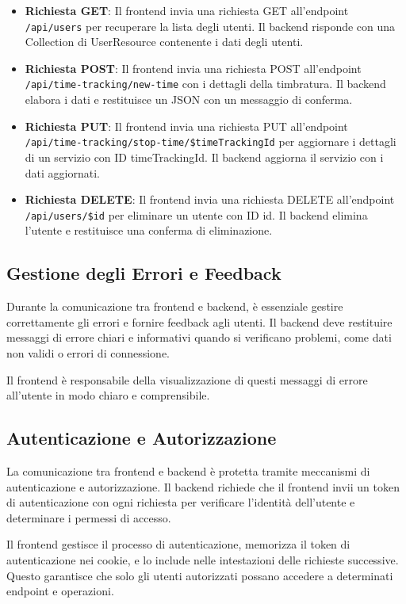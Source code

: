 \documentclass[twoside]{supsistudent}
\begin{document}
\begin{itemize}
  \item \textbf{Richiesta GET}: Il frontend invia una richiesta GET all'endpoint \texttt{/api/users} per recuperare la lista degli utenti. Il backend risponde con una Collection di UserResource contenente i dati degli utenti.
  \item \textbf{Richiesta POST}: Il frontend invia una richiesta POST all'endpoint \texttt{/api/time-tracking/new-time} con i dettagli della timbratura. Il backend elabora i dati e restituisce un JSON con un messaggio di conferma.
  \item \textbf{Richiesta PUT}: Il frontend invia una richiesta PUT all'endpoint \texttt{/api/time-tracking/stop-time/\$timeTrackingId} per aggiornare i dettagli di un servizio con ID timeTrackingId. Il backend aggiorna il servizio con i dati aggiornati.
  \item \textbf{Richiesta DELETE}: Il frontend invia una richiesta DELETE all'endpoint \texttt{/api/users/\$id} per eliminare un utente con ID id. Il backend elimina l'utente e restituisce una conferma di eliminazione.
\end{itemize}

\subsection{Gestione degli Errori e Feedback}

Durante la comunicazione tra frontend e backend, è essenziale gestire correttamente gli errori e fornire feedback agli utenti. Il backend deve restituire messaggi di errore chiari e informativi quando si verificano problemi, come dati non validi o errori di connessione.

Il frontend è responsabile della visualizzazione di questi messaggi di errore all'utente in modo chiaro e comprensibile.

\subsection{Autenticazione e Autorizzazione}

La comunicazione tra frontend e backend è protetta tramite meccanismi di autenticazione e autorizzazione. Il backend richiede che il frontend invii un token di autenticazione con ogni richiesta per verificare l'identità dell'utente e determinare i permessi di accesso.

Il frontend gestisce il processo di autenticazione, memorizza il token di autenticazione nei cookie, e lo include nelle intestazioni delle richieste successive. Questo garantisce che solo gli utenti autorizzati possano accedere a determinati endpoint e operazioni.
\end{document}
